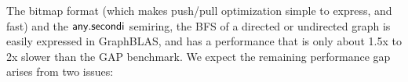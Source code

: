 


The bitmap format (which makes push/pull optimization
simple to express, and fast) and the $\mathbin{\mathsf{any.secondi}}$ %
semiring, the BFS of a
directed or undirected graph is easily expressed in GraphBLAS, and has a
performance that is only about 1.5x to 2x slower than the GAP benchmark.  We expect
the remaining performance gap arises from two issues:

